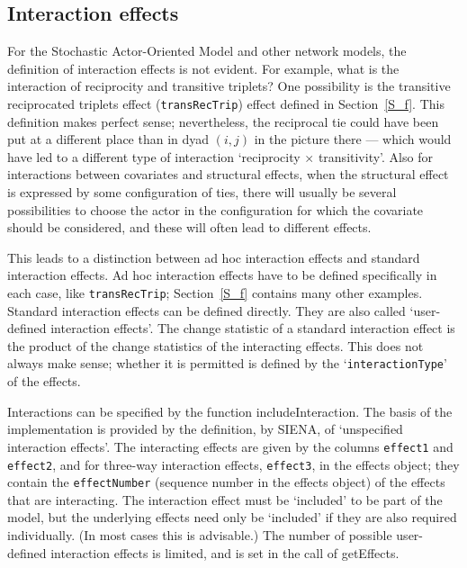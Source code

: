 \documentclass[a4paper,fleqn,11pt]{article}
\newcommand{\+}{\, + \,}
\newcommand{\sfn}[1]{\textsf{#1}}
\newcommand{\si}{{\sf SIENA}}
\newcommand{\SAOM}{{Stochastic Actor-Oriented Model }}
\begin{document}
\hypertarget{T_int_eff}{
\subsection{Interaction effects}
}
\label{S_int_eff}

For the \SAOM and other network models, the definition of interaction
effects is not evident. For example, what is the interaction of
reciprocity and transitive triplets? One possibility is the
transitive reciprocated triplets effect (\texttt{transRecTrip})
effect defined in Section~\ref{S_f}.
This definition makes perfect sense; nevertheless, the reciprocal tie could
have been put at a different place than in dyad $(i,j)$
in the picture there --- which would have led
to a different type of interaction `reciprocity $\times$ transitivity'.
Also for interactions between covariates and structural effects,
when the structural effect is expressed by some configuration of ties,
there will usually be several possibilities to choose the actor in the
configuration for which the covariate should be considered, and these will
often lead to different effects.

This leads to a distinction between ad hoc interaction effects and standard
interaction effects.
Ad hoc interaction effects have to be defined specifically in each case,
like \texttt{transRecTrip}; Section~\ref{S_f} contains many other examples.
Standard interaction effects can be defined directly.
They are also called `user-defined interaction effects'.
The change statistic of a standard interaction effect is the product of the
change statistics of the interacting effects.
This does not always make sense; whether it is permitted
is defined by the `\texttt{interactionType}' of the effects.

Interactions can be specified by the function \sfn{includeInteraction}.
The basis of the implementation is provided by the definition,
by \si, of `unspecified interaction effects'.
The interacting effects are given by
the columns \texttt{effect1} and \texttt{effect2},
and for three-way interaction effects, \texttt{effect3},
in the effects object; they contain the \texttt{effectNumber}
(sequence number in the effects object) of the effects that are interacting.
The interaction effect must be `included' to be part of the model,
but the underlying effects need only be `included' if
they are also required individually.
(In most cases this is advisable.)
The number of possible user-defined interaction effects is limited,
and is set in the call of \sfn{getEffects}.
\medskip
\end{document}
